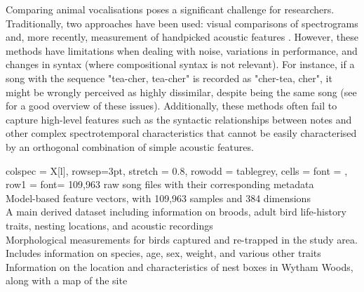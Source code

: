 Comparing animal vocalisations poses a significant challenge for researchers. Traditionally, two approaches have been used: visual comparisons of spectrograms and, more recently, measurement of handpicked acoustic features \parencite{goffinet2021}. However, these methods have limitations when dealing with noise, variations in performance, and changes in syntax (where compositional syntax is not relevant). For instance, if a song with the sequence "tea-cher, tea-cher" is recorded as "cher-tea, cher", it might be wrongly perceived as highly dissimilar, despite being the same song (see \cite{stowell2021, zandberg2022} for a good overview of these issues). Additionally, these methods often fail to capture high-level features such as the syntactic relationships between notes and other complex spectrotemporal characteristics that cannot be easily characterised by an orthogonal combination of simple acoustic features.

\begin{table}[ht!]
    \centering
    \label{table:summary}
    \begin{tblr}[
        theme=ntabs
        ]{
        colspec = {X[l]},
        rowsep=3pt,
        stretch = 0.8,
        row{odd} = {tablegrey}, %
        cells = {font = \fontsize{8pt}{8pt}\selectfont},
        row{1} = {font=\fontsize{8pt}{8pt}\selectfont} %
    }
        109,963 raw song files with their corresponding metadata\\
        Model-based feature vectors, with 109,963 samples and 384 dimensions\\
        A main derived dataset including information on broods, adult bird life-history traits, nesting locations, and acoustic recordings\\
        Morphological measurements for birds captured and re-trapped in the study area. Includes information on species, age, sex, weight, and various other traits\\
        Information on the location and characteristics of nest boxes in Wytham Woods, along with a map of the site\\
    \end{tblr}
\end{table}

